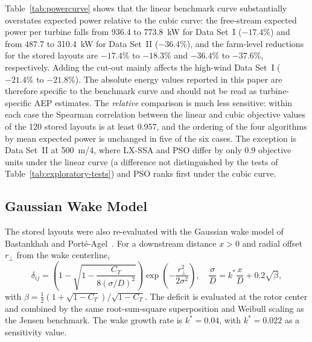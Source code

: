 Table~\ref{tab:powercurve} shows that the linear benchmark curve substantially overstates expected power relative to the cubic curve: the free-stream expected power per turbine falls from 936.4 to 773.8~kW for Data Set~I ($-17.4\%$) and from 487.7 to 310.4~kW for Data Set~II ($-36.4\%$), and the farm-level reductions for the stored layouts are $-17.4\%$ to $-18.3\%$ and $-36.4\%$ to $-37.6\%$, respectively. Adding the cut-out mainly affects the high-wind Data Set~I ($-21.4\%$ to $-21.8\%$). The absolute energy values reported in this paper are therefore specific to the benchmark curve and should not be read as turbine-specific AEP estimates. The \emph{relative} comparison is much less sensitive: within each case the Spearman correlation between the linear and cubic objective values of the 120 stored layouts is at least 0.957, and the ordering of the four algorithms by mean expected power is unchanged in five of the six cases. The exception is Data Set~II at 500~m/4, where LX-SSA and PSO differ by only 0.9 objective units under the linear curve (a difference not distinguished by the tests of Table~\ref{tab:exploratory-tests}) and PSO ranks first under the cubic curve.

\subsection{Gaussian Wake Model}
\label{sec:gaussian}
The stored layouts were also re-evaluated with the Gaussian wake model of Bastankhah and Port\'e-Agel~\cite{Bastankhah2014}. For a downstream distance $x>0$ and radial offset $r_\perp$ from the wake centerline,
\[
\delta_{ij}=\left(1-\sqrt{1-\frac{C_T}{8(\sigma/D)^2}}\right)\exp\!\left(-\frac{r_\perp^2}{2\sigma^2}\right),\quad \frac{\sigma}{D}=k^*\frac{x}{D}+0.2\sqrt{\beta},
\]
with $\beta=\tfrac12(1+\sqrt{1-C_T})/\sqrt{1-C_T}$. The deficit is evaluated at the rotor center and combined by the same root-sum-square superposition and Weibull scaling as the Jensen benchmark. The wake growth rate is $k^*=0.04$, with $k^*=0.022$ as a sensitivity value.

